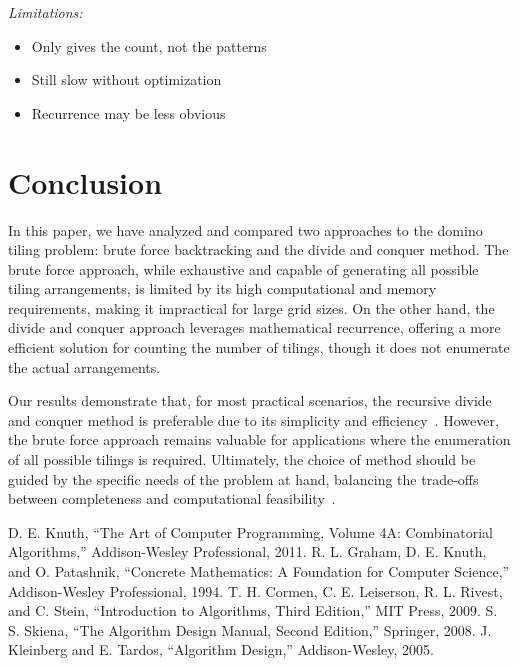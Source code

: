 \documentclass[conference]{IEEEtran}
\begin{document}
\textit{Limitations:}
\begin{itemize}
    \item Only gives the count, not the patterns
    \item Still slow without optimization
    \item Recurrence may be less obvious
\end{itemize}

\section{Conclusion}

In this paper, we have analyzed and compared two approaches to the domino tiling problem: brute force backtracking and the divide and conquer method. The brute force approach, while exhaustive and capable of generating all possible tiling arrangements, is limited by its high computational and memory requirements, making it impractical for large grid sizes. On the other hand, the divide and conquer approach leverages mathematical recurrence, offering a more efficient solution for counting the number of tilings, though it does not enumerate the actual arrangements.

Our results demonstrate that, for most practical scenarios, the recursive divide and conquer method is preferable due to its simplicity and efficiency~\cite{b1, b2}. However, the brute force approach remains valuable for applications where the enumeration of all possible tilings is required. Ultimately, the choice of method should be guided by the specific needs of the problem at hand, balancing the trade-offs between completeness and computational feasibility~\cite{b3, b5}.

\begin{thebibliography}{00}
 D. E. Knuth, ``The Art of Computer Programming, Volume 4A: Combinatorial Algorithms,'' Addison-Wesley Professional, 2011.
 R. L. Graham, D. E. Knuth, and O. Patashnik, ``Concrete Mathematics: A Foundation for Computer Science,'' Addison-Wesley Professional, 1994.
 T. H. Cormen, C. E. Leiserson, R. L. Rivest, and C. Stein, ``Introduction to Algorithms, Third Edition,'' MIT Press, 2009.
 S. S. Skiena, ``The Algorithm Design Manual, Second Edition,'' Springer, 2008.
 J. Kleinberg and E. Tardos, ``Algorithm Design,'' Addison-Wesley, 2005.
\end{thebibliography}
\end{document}
